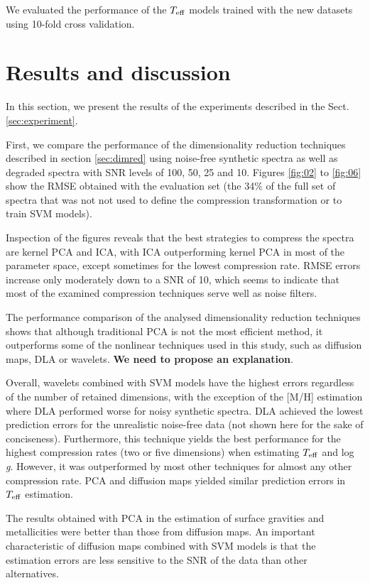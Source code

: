 \documentclass[a4paper,fleqn,usenatbib]{mnras}
\begin{document}
{{{We evaluated the performance of the $T_{\rm eff}$ models trained with
the new datasets using 10-fold cross validation.

\section{Results and discussion}
\label{sec:results}
In this section, we present the results of the experiments 
  described in the Sect. \ref{sec:experiment}.

First, we compare the performance of the dimensionality reduction
techniques described in section \ref{sec:dimred} using noise-free
synthetic spectra as well as degraded spectra with SNR levels of 100,
50, 25 and 10.  Figures \ref{fig:02} to \ref{fig:06} show the RMSE
obtained with the evaluation set (the 34\% of the full set of spectra
that was not not used to define the compression transformation or to
train SVM models).

Inspection of the figures reveals that the best strategies to compress
the spectra are kernel PCA and ICA, with ICA outperforming kernel PCA
in most of the parameter space, except sometimes for the lowest
compression rate. RMSE errors increase only moderately down to a SNR
of 10, which seems to indicate that most of the examined compression
techniques serve well as noise filters.

The performance comparison of the analysed dimensionality reduction
techniques shows that although traditional PCA is not the most
efficient method, it outperforms some of the nonlinear techniques used
in this study, such as diffusion maps, DLA or wavelets. {\bf We need
  to propose an explanation}. 

Overall, wavelets combined with SVM models have the highest errors
regardless of the number of retained dimensions, with the exception of
the [M/H] estimation where DLA performed worse for noisy synthetic
spectra. DLA achieved the lowest prediction errors for the unrealistic
noise-free data (not shown here for the sake of
conciseness). Furthermore, this technique yields the best performance
for the highest compression rates (two or five dimensions) when
estimating $T_{\rm eff}$ and log \textit{g}. However, it was
outperformed by most other techniques for almost any other compression
rate. PCA and diffusion maps yielded similar prediction errors in
$T_{\rm eff}$ estimation.

The results obtained with PCA in the estimation of surface gravities
and metallicities were better than those from diffusion maps. An
important characteristic of diffusion maps combined with SVM models is
that the estimation errors are less sensitive to the SNR of the data
than other alternatives.

}}}
\end{document}
